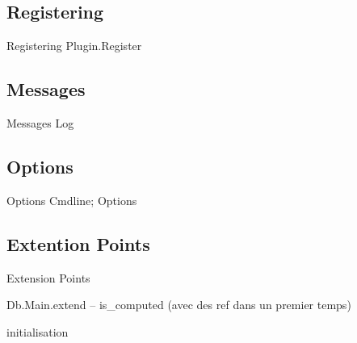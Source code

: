 \subsection{Registering}

\begin{frame}{Registering}
  Plugin.Register
\end{frame}


\subsection{Messages}

\begin{frame}{Messages}
  Log
\end{frame}


\subsection{Options}

\begin{frame}{Options}
  Cmdline; Options
\end{frame}


\subsection{Extention Points}

\begin{frame}{Extension Points}

  Db.Main.extend -- is\_computed (avec des ref dans un premier temps)

  initialisation
\end{frame}
